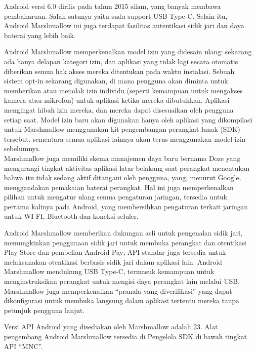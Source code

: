\begin{enumerate}
Android versi 6.0 dirilis pada tahun 2015 silam, yang banyak membawa pembaharuan. Salah satunya yaitu suda support USB Type-C. Selain itu, Android Marshmallow ini juga terdapat fasilitas autentikasi sidik jari dan daya baterai yang lebih baik. 

Android Marshmallow memperkenalkan model izin yang didesain ulang: sekarang ada hanya delapan kategori izin, dan aplikasi yang tidak lagi secara otomatis diberikan semua hak akses mereka ditentukan pada waktu instalasi. Sebuah sistem opt-in sekarang digunakan, di mana pengguna akan diminta untuk memberikan atau menolak izin individu (seperti kemampuan untuk mengakses kamera atau mikrofon) untuk aplikasi ketika mereka dibutuhkan. Aplikasi mengingat hibah izin mereka, dan mereka dapat disesuaikan oleh pengguna setiap saat. Model izin baru akan digunakan hanya oleh aplikasi yang dikompilasi untuk Marshmallow menggunakan kit pengembangan perangkat lunak (SDK) tersebut, sementara semua aplikasi lainnya akan terus menggunakan model izin sebelumnya.\\

Marshmallow juga memiliki skema manajemen daya baru bernama Doze yang mengurangi tingkat aktivitas aplikasi latar belakang saat perangkat menentukan bahwa itu tidak sedang aktif ditangani oleh pengguna, yang, menurut Google, menggandakan pemakaian baterai perangkat. Hal ini juga memperkenalkan pilihan untuk mengatur ulang semua pengaturan jaringan, tersedia untuk pertama kalinya pada Android, yang membersihkan pengaturan terkait jaringan untuk WI-FI, Bluetooth dan koneksi seluler.

Android Marshmallow memberikan dukungan asli untuk pengenalan sidik jari, memungkinkan penggunaan sidik jari untuk membuka perangkat dan otentikasi Play Store dan pembelian Android Pay; API standar juga tersedia untuk melaksanakan otentikasi berbasis sidik jari dalam aplikasi lain. Android Marshmallow mendukung USB Type-C, termasuk kemampuan untuk menginstruksikan perangkat untuk mengisi daya perangkat lain melalui USB. Marshmallow juga memperkenalkan “pranala yang diverifikasi” yang dapat dikonfigurasi untuk membuka langsung dalam aplikasi tertentu mereka tanpa petunjuk pengguna lanjut.

Versi API Android yang disediakan oleh Marshmallow adalah 23. Alat pengembang Android Marshmallow tersedia di Pengelola SDK di bawah tingkat API “MNC”.


\end{enumerate}

